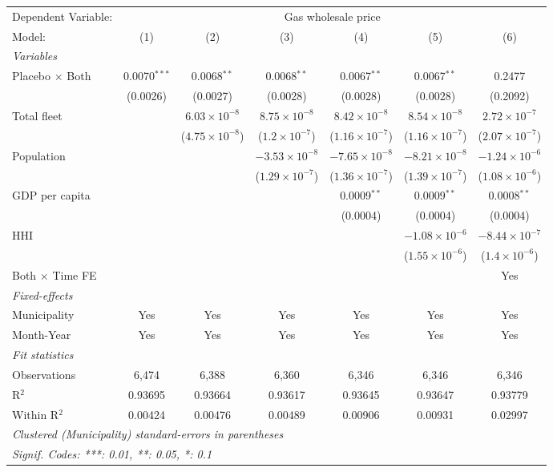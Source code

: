 \documentclass[
]{article}
\begin{document}
\begin{tabular}{lcccccc}
\tabularnewline\midrule\midrule
Dependent Variable:&\multicolumn{6}{c}{Gas wholesale price}\\
Model:&(1) & (2) & (3) & (4) & (5) & (6)\\
\midrule \emph{Variables}&   &   &   &   &   &  \\
Placebo $\times $ Both & 0.0070$^{***}$ & 0.0068$^{**}$ & 0.0068$^{**}$ & 0.0067$^{**}$ & 0.0067$^{**}$ & 0.2477\\
  &(0.0026) & (0.0027) & (0.0028) & (0.0028) & (0.0028) & (0.2092)\\
Total fleet &    & $6.03\times 10^{-8}$ & $8.75\times 10^{-8}$ & $8.42\times 10^{-8}$ & $8.54\times 10^{-8}$ & $2.72\times 10^{-7}$\\
  &   & ($4.75\times 10^{-8}$) & ($1.2\times 10^{-7}$) & ($1.16\times 10^{-7}$) & ($1.16\times 10^{-7}$) & ($2.07\times 10^{-7}$)\\
Population &    &    & $-3.53\times 10^{-8}$ & $-7.65\times 10^{-8}$ & $-8.21\times 10^{-8}$ & $-1.24\times 10^{-6}$\\
  &   &    & ($1.29\times 10^{-7}$) & ($1.36\times 10^{-7}$) & ($1.39\times 10^{-7}$) & ($1.08\times 10^{-6}$)\\
GDP per capita &    &    &    & 0.0009$^{**}$ & 0.0009$^{**}$ & 0.0008$^{**}$\\
  &   &    &    & (0.0004) & (0.0004) & (0.0004)\\
HHI &    &    &    &    & $-1.08\times 10^{-6}$ & $-8.44\times 10^{-7}$\\
  &   &    &    &    & ($1.55\times 10^{-6}$) & ($1.4\times 10^{-6}$)\\
Both $\times$ Time FE &  &  &  &  &  & Yes\\
\midrule \emph{Fixed-effects}&   &   &   &   &   &  \\
Municipality & Yes & Yes & Yes & Yes & Yes & Yes\\
Month-Year & Yes & Yes & Yes & Yes & Yes & Yes\\
\midrule \emph{Fit statistics}&  & & & & & \\
Observations & 6,474&6,388&6,360&6,346&6,346&6,346\\
R$^2$ & 0.93695&0.93664&0.93617&0.93645&0.93647&0.93779\\
Within R$^2$ & 0.00424&0.00476&0.00489&0.00906&0.00931&0.02997\\
\midrule\midrule\multicolumn{7}{l}{\emph{Clustered (Municipality) standard-errors in parentheses}}\\
\multicolumn{7}{l}{\emph{Signif. Codes: ***: 0.01, **: 0.05, *: 0.1}}\\
\end{tabular}
\end{document}
